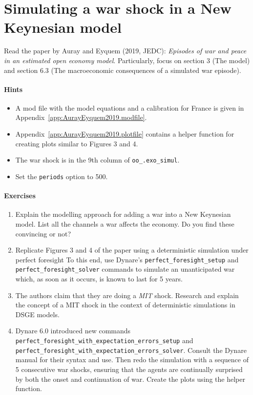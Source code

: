 \documentclass[a4paper]{scrartcl}
\begin{document}
\newpage

\section{Simulating a war shock in a New Keynesian model}
Read the paper by Auray and Eyquem (2019, JEDC): \emph{Episodes of war and peace in an estimated open economy model}.
Particularly, focus on section 3 (The model) and section 6.3 (The macroeconomic consequences of a simulated war episode).

\paragraph{Hints}

\begin{itemize}
\item
A mod file with the model equations and a calibration for France is given in Appendix~\ref{app:AurayEyquem2019.modfile}.

\item
Appendix~\ref{app:AurayEyquem2019.plotfile} contains a helper function for creating plots similar to Figures 3 and 4.

\item
The war shock is in the 9th column of \texttt{oo\_.exo\_simul}.

\item
Set the \texttt{periods} option to 500.
\end{itemize}

\paragraph{Exercises}

\begin{enumerate}

\item
Explain the modelling approach for adding a war into a New Keynesian model.
List all the channels a war affects the economy.
Do you find these convincing or not?

\item
Replicate Figures 3 and 4 of the paper using a deterministic simulation under perfect foresight
To this end, use Dynare's \texttt{perfect\_foresight\_setup} and \texttt{perfect\_foresight\_solver} commands
  to simulate an unanticipated war which, as soon as it occurs, is known to last for 5 years.

\item
The authors claim that they are doing a \emph{MIT} shock.
Research and explain the concept of a MIT shock in the context of deterministic simulations in DSGE models.

\item
Dynare 6.0 introduced new commands \texttt{perfect\_foresight\_with\_expectation\_errors\_setup} and \texttt{perfect\_foresight\_with\_expectation\_errors\_solver}.
Consult the Dynare manual for their syntax and use.
Then redo the simulation with a sequence of 5 consecutive war shocks, ensuring that the agents are continually surprised by both the onset and continuation of war.
Create the plots using the helper function.
    
\end{enumerate}
\end{document}
